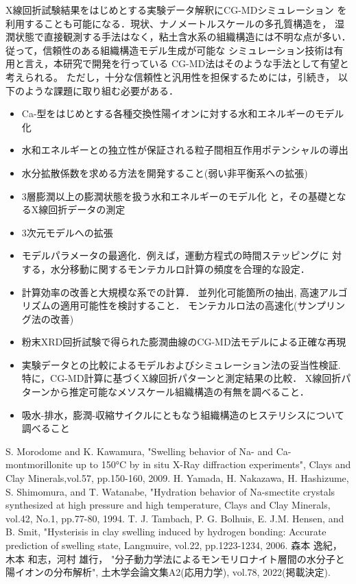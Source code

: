 ﻿\documentclass[11pt,a4j]{jarticle}
\begin{document}
X線回折試験結果をはじめとする実験データ解釈にCG-MDシミュレーション
を利用することも可能になる．現状、ナノメートルスケールの多孔質構造を，
湿潤状態で直接観測する手法はなく，粘土含水系の組織構造には不明な点が多い．
従って，信頼性のある組織構造モデル生成が可能な
シミュレーション技術は有用と言え，本研究で開発を行っている
CG-MD法はそのような手法として有望と考えられる。
ただし，十分な信頼性と汎用性を担保するためには，引続き，
以下のような課題に取り組む必要がある．
\begin{itemize}
\item
	Ca-型をはじめとする各種交換性陽イオンに対する水和エネルギーのモデル化
\item
	水和エネルギーとの独立性が保証される粒子間相互作用ポテンシャルの導出
\item
	水分拡散係数を求める方法を開発すること(弱い非平衡系への拡張)
\item
    	3層膨潤以上の膨潤状態を扱う水和エネルギーのモデル化
	と，その基礎となるX線回折データの測定
\item
	3次元モデルへの拡張
\item
	モデルパラメータの最適化．例えば，運動方程式の時間ステッピングに
	対する，水分移動に関するモンテカルロ計算の頻度を合理的な設定．
\item
	計算効率の改善と大規模な系での計算．
	並列化可能箇所の抽出, 高速アルゴリズムの適用可能性を検討すること．
	モンテカルロ法の高速化(サンプリング法の改善)
\item
	粉末XRD回折試験で得られた膨潤曲線のCG-MD法モデルによる正確な再現
\item
	実験データとの比較によるモデルおよびシミュレーション法の妥当性検証. 
	特に，CG-MD計算に基づくX線回折パターンと測定結果の比較．
	X線回折パターンから推定可能なメソスケール組織構造の有無を調べること．
\item
	吸水-排水，膨潤-収縮サイクルにともなう組織構造のヒステリシスについて調べること
\end{itemize}
\begin{thebibliography}{99}
	S. Morodome and K. Kawamura, 
	"Swelling behavior of Na- and Ca-montmorillonite up to 150°C by 
	in situ X-Ray diffraction experiments", 
	Clays and Clay Minerals,vol.57, pp.150-160, 2009.
	H. Yamada, H. Nakazawa, H. Hashizume, S. Shimomura, and T. Watanabe, 
	"Hydration behavior of Na-smectite crystals synthesized at high pressure 
	and high temperature, Clays and Clay Minerals, vol.42, No.1, pp.77-80, 1994.
	T. J. Tambach, P. G. Bolhuis, E. J.M. Hensen, and B. Smit, 
	"Hysterisis in clay swelling induced by hydrogen bonding: 
		Accurate prediction of swelling state, Langmuire, 
	vol.22, pp.1223-1234, 2006.
	森本 逸紀，木本 和志，河村 雄行，
	"分子動力学法によるモンモリロナイト層間の水分子と陽イオンの分布解析", 
		土木学会論文集A2(応用力学), vol.78, 2022(掲載決定). 	
\end{thebibliography}
\end{document}
